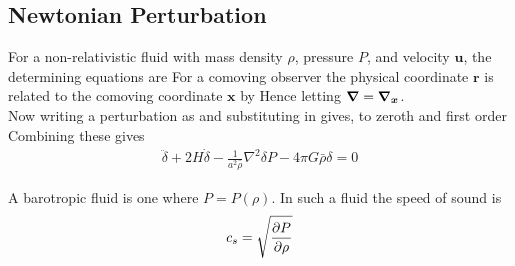 \documentclass{article}
\begin{document}
\subsection{Newtonian Perturbation}

For a non-relativistic fluid with mass density $\rho$, pressure $P$, and velocity $\bm{u}$, the determining equations are 
For a comoving observer the physical coordinate $\bm{r}$ is related to the comoving coordinate $\bm{x}$ by 
Hence 
letting $\grad = \grad_{\bm{x}}$. \\
Now writing a perturbation as 
and substituting in gives, to zeroth and first order 
Combining these gives 
\begin{align} \label{eq:CSM:1}
\ddot{\delta} + 2H\dot{\delta} - \frac{1}{a^2\bar{\rho}}\nabla^2 \delta P - 4\pi G \bar{\rho}\delta = 0
\end{align}

\begin{definition}
A barotropic fluid is one where $P=P(\rho)$. In such a fluid the speed of sound is 
\[
c_s = \sqrt{\pd[P]{\rho}}
\]
\end{definition}
\end{document}
